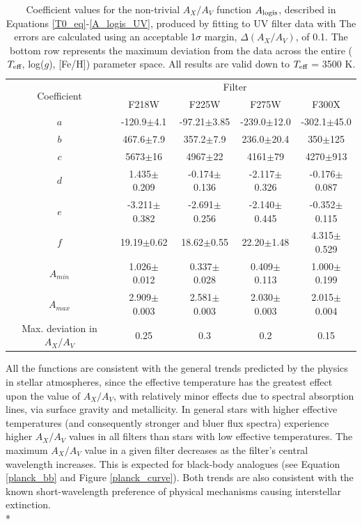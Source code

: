 \documentclass[12pt, a4paper]{report}
\begin{document}
\begin{table}
\begin{center}
\begin{tabular}{ccccc}
\hline
\multirow{2}{*}{Coefficient} & \multicolumn{4}{c}{Filter} \\
 & F218W & F225W & F275W & F300X \\
\hline
$a$ & -120.9$\pm$4.1 & -97.21$\pm$3.85 & -239.0$\pm$12.0 & -302.1$\pm$45.0 \\
$b$ & 467.6$\pm$7.9 & 357.2$\pm$7.9 & 236.0$\pm$20.4 & 350$\pm$125 \\
$c$ & 5673$\pm$16 & 4967$\pm$22 & 4161$\pm$79 & 4270$\pm$913 \\
$d$ & 1.435$\pm$0.209 & -0.174$\pm$0.136 & -2.117$\pm$0.326 & -0.176$\pm$0.087 \\
$e$ & -3.211$\pm$0.382 & -2.691$\pm$0.256  & -2.140$\pm$0.445 & -0.352$\pm$0.115 \\
$f$ & 19.19$\pm$0.62 & 18.62$\pm$0.55  & 22.20$\pm$1.48 & 4.315$\pm$0.529 \\
$A_{min}$ & 1.026$\pm$0.012 & 0.337$\pm$0.028 & 0.409$\pm$0.113 & 1.000$\pm$0.199 \\
$A_{max}$ & 2.909$\pm$0.003 & 2.581$\pm$0.003 & 2.030$\pm$0.003 & 2.015$\pm$0.004 \\
\hline
Max. deviation in $A_{X}/A_{V}$ & 0.25 & 0.3 & 0.2 & 0.15 \\
\hline
\end{tabular}
\caption{Coefficient values for the non-trivial $A_{X}/A_{V}$ function $A_{\textnormal{logis}}$, described in Equations \ref{T0_eq}-\ref{A_logis_UV}, produced by fitting to UV filter data with The errors are calculated using an acceptable 1$\sigma$ margin, $\Delta(A_{X}/A_{V})$, of 0.1. The bottom row represents the maximum deviation from the data across the entire ($T_{\textnormal{eff}}$, log($g$), [Fe/H]) parameter space. All results are valid down to $T_{\textnormal{eff}}$ = 3500 K.}
\label{UV_coeffs_table}
\end{center}
\end{table}

All the functions are consistent with the general trends predicted by the physics in stellar atmospheres, since the effective temperature has the greatest effect upon the value of $A_{X}/A_{V}$, with relatively minor effects due to spectral absorption lines, via surface gravity and metallicity. In general stars with higher effective temperatures (and consequently stronger and bluer flux spectra) experience higher $A_{X}/A_{V}$ values in all filters than stars with low effective temperatures. The maximum $A_{X}/A_{V}$ value in a given filter decreases as the filter's central wavelength increases. This is expected for black-body analogues (see Equation \ref{planck_bb} and Figure \ref{planck_curve}). Both trends are also consistent with the known short-wavelength preference of physical mechanisms causing interstellar extinction.\\*
\end{document}

